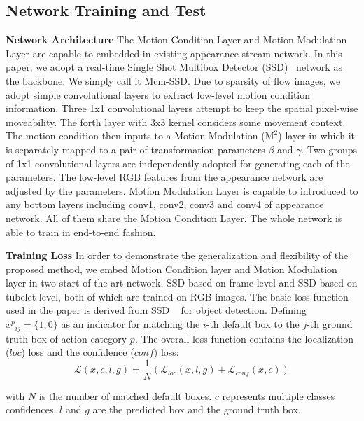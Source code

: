 \documentclass[10pt,twocolumn,letterpaper]{article}
\begin{document}
\subsection{Network Training and Test}
{\bf{Network Architecture}} The Motion Condition Layer and Motion Modulation Layer are capable to embedded in existing appearance-stream network. In this paper, we adopt a real-time Single Shot Multibox Detector (SSD)~\cite{Singh2017, Liu2016} network as the backbone. We simply call it Mcm-SSD. Due to sparsity of flow images, we adopt simple convolutional layers to extract low-level motion condition information. Three 1x1 convolutional layers attempt to keep the spatial pixel-wise moveability. The forth layer with 3x3 kernel considers some movement context. The motion condition then inputs to a Motion Modulation ($\mathrm{M}^2$) layer in which it is separately mapped to a pair of transformation parameters $\beta$ and $\gamma$. Two groups of 1x1 convolutional layers are independently adopted for generating each of the parameters. The low-level RGB features from the appearance network are adjusted by the parameters. Motion Modulation Layer is capable to introduced to any bottom layers including conv1, conv2, conv3 and conv4 of appearance network. All of them share the Motion Condition Layer. The whole network is able to train in end-to-end fashion.

{\bf{Training Loss}} In order to demonstrate the generalization and flexibility of the proposed method, we embed Motion Condition layer and Motion Modulation layer in two start-of-the-art network, SSD based on frame-level and SSD based on tubelet-level, both of which are trained on RGB images. The basic loss function used in the paper is derived from SSD ~\cite{Liu2016} for object detection. Defining ${x^p}_{ij}=\{1,0\}$ as an indicator for matching the $i$-th default box to the $j$-th ground truth box of action category $p$. The overall loss function contains the localization ($loc$) loss and the confidence ($conf$) loss:
\begin{equation}
\mathcal{L}(x,c,l,g) = \frac{1}{N}(\mathcal{L}_{loc}(x,l,g)+\mathcal{L}_{conf}(x,c))
\end{equation}

with $N$ is the number of matched default boxes. $c$ represents multiple classes confidences. $l$ and $g$ are the predicted box and the ground truth box.
\end{document}
